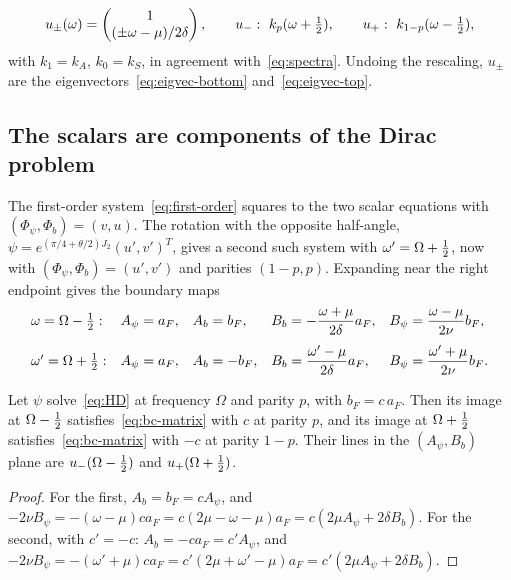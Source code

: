 \begin{equation}\label{eq:upm}
u_\pm(\omega)=\begin{pmatrix}1\\(\pm\omega-\mu)/2\delta\end{pmatrix},\qquad u_-:\ k_p(\omega+\tfrac12),\qquad u_+:\ k_{1-p}(\omega-\tfrac12),
\end{equation}
with $k_1=k_A$, $k_0=k_S$, in agreement with~\eqref{eq:spectra}. Undoing the rescaling, $u_\pm$ are the eigenvectors~\eqref{eq:eigvec-bottom} and~\eqref{eq:eigvec-top}.

\subsection{The scalars are components of the Dirac problem}

The first-order system~\eqref{eq:first-order} squares to the two scalar equations with $(\Phi_\psi,\Phi_b)=(v,u)$. The rotation with the opposite half-angle, $\psi=e^{(\pi/4+\theta/2)J_2}(u',v')^T$, gives a second such system with $\omega'=\Omega+\tfrac12$, now with $(\Phi_\psi,\Phi_b)=(u',v')$ and parities $(1-p,p)$. Expanding near the right endpoint gives the boundary maps
\begin{equation}\label{eq:maps}
\begin{array}{lllll}
\omega=\Omega-\tfrac12:&A_\psi=a_F,&A_b=b_F,&B_b=-\dfrac{\omega+\mu}{2\delta}a_F,&B_\psi=\dfrac{\omega-\mu}{2\nu}b_F,\\[2.5ex]
\omega'=\Omega+\tfrac12:&A_\psi=a_F,&A_b=-b_F,&B_b=\dfrac{\omega'-\mu}{2\delta}a_F,&B_\psi=\dfrac{\omega'+\mu}{2\nu}b_F.
\end{array}
\end{equation}

\begin{proposition}\label{prop:maps}
Let $\psi$ solve~\eqref{eq:HD} at frequency $\Omega$ and parity $p$, with $b_F=c\,a_F$. Then its image at $\Omega-\tfrac12$ satisfies~\eqref{eq:bc-matrix} with $c$ at parity $p$, and its image at $\Omega+\tfrac12$ satisfies~\eqref{eq:bc-matrix} with $-c$ at parity $1-p$. Their lines in the $(A_\psi,B_b)$ plane are $u_-(\Omega-\tfrac12)$ and $u_+(\Omega+\tfrac12)$.
\end{proposition}

\begin{proof}
For the first, $A_b=b_F=cA_\psi$, and $-2\nu B_\psi=-(\omega-\mu)ca_F=c(2\mu-\omega-\mu)a_F=c(2\mu A_\psi+2\delta B_b)$. For the second, with $c'=-c$: $A_b=-ca_F=c'A_\psi$, and $-2\nu B_\psi=-(\omega'+\mu)ca_F=c'(2\mu+\omega'-\mu)a_F=c'(2\mu A_\psi+2\delta B_b)$.
\end{proof}

